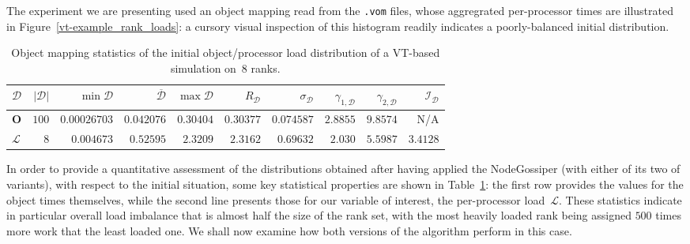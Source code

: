 The experiment we are presenting used an object mapping read from the
\texttt{.vom} files, whose aggregrated per-processor times are
illustrated in Figure~\ref{vt-example_rank_loads}: a cursory visual inspection
of this histogram readily indicates a poorly-balanced initial distribution.

\begin{table}[htb!]
\begin{center}
\begin{tabular}{@{}lrrrrrrrrr@{}}
\hline
$\mathcal{D}$ &
$\vert\mathcal{D}\vert$ &
$\min{\mathcal{D}}$ & 
$\overline{\mathcal{D}}$ & 
$\max{\mathcal{D}}$ &
$R_{\mathcal{D}}$ &
$\sigma_{\mathcal{D}}$ &
$\gamma_{1,\mathcal{D}}$ &
$\gamma_{2,\mathcal{D}}$ &
$\mathcal{I}_{\mathcal{D}}$ \\
\hline\hline
\textbf{O} &
$100$     & $0.00026703$ & $0.042076$ & $0.30404$ &
$0.30377$ & $0.074587$   &$2.8855$    & $9.8574$ &
N/A \\\hline
$\mathcal{L}$ &
$8$      & $0.004673$ & $0.52595$ & $2.3209$ &
$2.3162$ & $0.69632$  & $2.030$   & $5.5987$ &
$3.4128$\\\hline
\end{tabular}
\end{center}
\caption{\label{t:vt-example} Object mapping statistics of the initial
object/processor load distribution of a \textsf{VT}-based simulation
on~8 ranks.}
\end{table}

In order to provide a quantitative assessment of the distributions
obtained after having applied the \textsf{NodeGossiper} (with either
of its two of variants), with respect to the initial situation, some
key statistical properties are shown in Table~\ref{t:vt-example}: the 
first row provides the values for the object times themselves, while
the second line presents those for our variable of interest, the
per-processor load~$\mathcal{L}$. 
These statistics indicate in particular overall load imbalance
that is almost half the size of the rank set, with the most heavily
loaded rank being assigned $500$ times more work that the least loaded
one.
We shall now examine how both versions of the algorithm perform in
this case.

  

